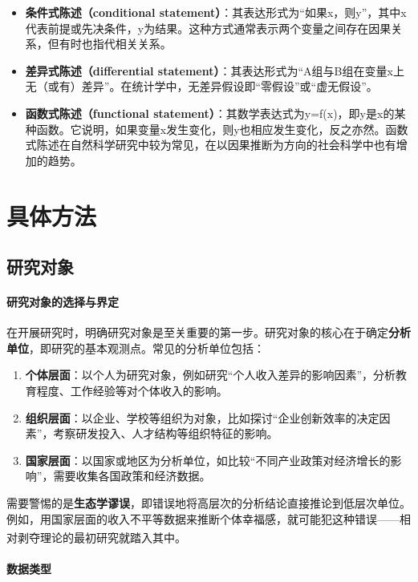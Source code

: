 \begin{itemize}
	\item
	\textbf{条件式陈述（conditional
		statement）}：其表达形式为``如果x，则y''，其中x代表前提或先决条件，y为结果。这种方式通常表示两个变量之间存在因果关系，但有时也指代相关关系。
	\item
	\textbf{差异式陈述（differential
		statement）}：其表达形式为``A组与B组在变量x上无（或有）差异''。在统计学中，无差异假设即``零假设''或``虚无假设''。
	\item
	\textbf{函数式陈述（functional
		statement）}：其数学表达式为y=f(x)，即y是x的某种函数。它说明，如果变量x发生变化，则y也相应发生变化，反之亦然。函数式陈述在自然科学研究中较为常见，在以因果推断为方向的社会科学中也有增加的趋势。
\end{itemize}

\section{具体方法}

\subsection{研究对象}

\paragraph*{研究对象的选择与界定}

在开展研究时，明确研究对象是至关重要的第一步。研究对象的核心在于确定\textbf{分析单位}，即研究的基本观测点。常见的分析单位包括：

\begin{enumerate}
	\item
	\textbf{个体层面}：以个人为研究对象，例如研究``个人收入差异的影响因素''，分析教育程度、工作经验等对个体收入的影响。
	\item
	\textbf{组织层面}：以企业、学校等组织为对象，比如探讨``企业创新效率的决定因素''，考察研发投入、人才结构等组织特征的影响。
	\item
	\textbf{国家层面}：以国家或地区为分析单位，如比较``不同产业政策对经济增长的影响''，需要收集各国政策和经济数据。
\end{enumerate}

需要警惕的是\textbf{生态学谬误}，即错误地将高层次的分析结论直接推论到低层次单位。例如，用国家层面的收入不平等数据来推断个体幸福感，就可能犯这种错误——相对剥夺理论的最初研究就踏入其中\textsuperscript{\cite{4}}。

\paragraph*{数据类型}

